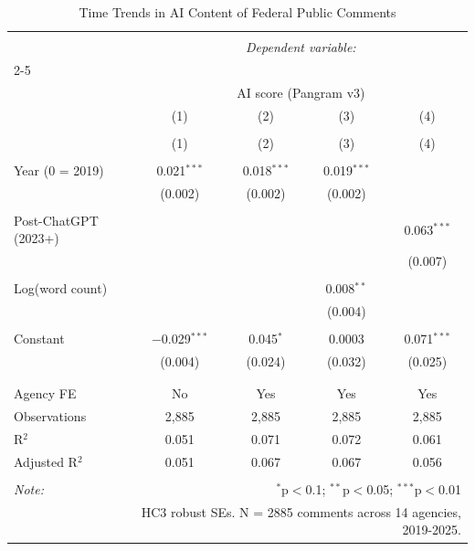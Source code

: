 
\begin{table}[!htbp] \centering 
  \caption{Time Trends in AI Content of Federal Public Comments} 
  \label{} 
\begin{tabular}{@{\extracolsep{5pt}}lcccc} 
\\[-1.8ex]\hline 
\hline \\[-1.8ex] 
 & \multicolumn{4}{c}{\textit{Dependent variable:}} \\ 
\cline{2-5} 
\\[-1.8ex] & \multicolumn{4}{c}{AI score (Pangram v3)} \\ 
 & (1) & (2) & (3) & (4) \\ 
\\[-1.8ex] & (1) & (2) & (3) & (4)\\ 
\hline \\[-1.8ex] 
 Year (0 = 2019) & 0.021$^{***}$ & 0.018$^{***}$ & 0.019$^{***}$ &  \\ 
  & (0.002) & (0.002) & (0.002) &  \\ 
  & & & & \\ 
 Post-ChatGPT (2023+) &  &  &  & 0.063$^{***}$ \\ 
  &  &  &  & (0.007) \\ 
  & & & & \\ 
 Log(word count) &  &  & 0.008$^{**}$ &  \\ 
  &  &  & (0.004) &  \\ 
  & & & & \\ 
 Constant & $-$0.029$^{***}$ & 0.045$^{*}$ & 0.0003 & 0.071$^{***}$ \\ 
  & (0.004) & (0.024) & (0.032) & (0.025) \\ 
  & & & & \\ 
\hline \\[-1.8ex] 
Agency FE & No & Yes & Yes & Yes \\ 
Observations & 2,885 & 2,885 & 2,885 & 2,885 \\ 
R$^{2}$ & 0.051 & 0.071 & 0.072 & 0.061 \\ 
Adjusted R$^{2}$ & 0.051 & 0.067 & 0.067 & 0.056 \\ 
\hline 
\hline \\[-1.8ex] 
\textit{Note:}  & \multicolumn{4}{r}{$^{*}$p$<$0.1; $^{**}$p$<$0.05; $^{***}$p$<$0.01} \\ 
 & \multicolumn{4}{r}{HC3 robust SEs. N = 2885 comments across 14 agencies, 2019-2025.} \\ 
\end{tabular} 
\end{table} 

